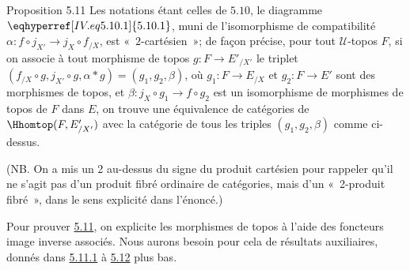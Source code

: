\documentclass[10pt]{../fichiers-configuration-latex/smfart}
\begin{document}
\begin{enonce*}{Proposition 5.11}
Les notations étant celles de $\hyperref[IV.subsec5.10]{5.10}$, le diagramme
$\eqhyperref[IV.eq5.10.1]{5.10.1}$, muni de l'isomorphisme de compatibilité
$\alpha:f\circ j_{X'}\rightarrow j_X\circ f_{/X}$, est « $2$-cartésien »; de façon précise, pour tout
$𝒰$-topos $F$, si on associe à tout morphisme de topos
$g:F\rightarrow E'_{/X'}$ le triplet $(f_{/X}\circ g, j_{X'}\circ g,
\alpha\ast g)=(g_1, g_2,\beta)$, où $g_1:F\rightarrow E_{/X}$ et
$g_2:F\rightarrow E'$ sont des morphismes de topos, et
$\beta:j_X\circ g_1\rightarrow f\circ g_2$ est un isomorphisme de
morphismes de topos de $F$ dans $E$, on trouve une équivalence de
catégories de $\Hhomtop(F,E'_{/X'})$ avec la catégorie
 de
tous les triples $(g_1,g_2,\beta)$ comme ci-dessus.
\end{enonce*}

(NB. On a mis un 2 au-dessus du signe du produit cartésien pour
rappeler qu'il ne s'agit pas d'un produit fibré ordinaire de
catégories, mais d'un « 2-produit fibré », dans le sens
explicité dans l'énoncé.)

Pour prouver \hyperref[IV.prop5.11]{5.11}, on explicite les morphismes de topos
à l'aide des foncteurs image inverse associés. Nous aurons
besoin pour cela de résultats auxiliaires, donnés dans
\hyperref[IV.subsubsec5.11.1]{5.11.1} à \hyperref[IV.prop5.12]{5.12} plus bas.

\setcounter{subsection}{11} \setcounter{subsubsection}{0}
\end{document}
